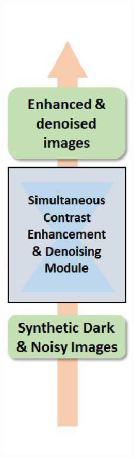 \documentclass[a4paper, 10pt]{article}
\begin{document}
\begin{figure}[htbp]
\begin{subfigure}{0.18\textwidth}
			\includegraphics[width=\linewidth]{picture/LLIE/LLNet/LLNet}

\end{subfigure}
\end{figure}
\end{document}
